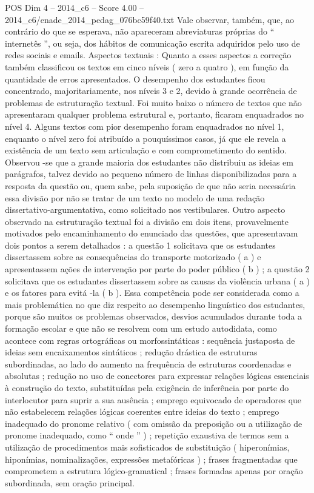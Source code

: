 \begin{textsample}{POS Dim 4 – 2014\_c6 – Score 4.00 – 2014\_c6/enade\_2014\_pedag\_076bc59f40.txt}
Vale observar, também, que, ao contrário do que se esperava, não apareceram abreviaturas próprias do “ internetês ”, ou seja, dos hábitos de comunicação escrita adquiridos pelo uso de redes sociais e emails.
Aspectos textuais : Quanto a esses aspectos a correção também classificou os textos em cinco níveis ( zero a quatro ), em função da quantidade de erros apresentados.
O desempenho dos estudantes ficou concentrado, majoritariamente, nos níveis 3 e 2, devido à grande ocorrência de problemas de estruturação textual.
Foi muito baixo o número de textos que não apresentaram qualquer problema estrutural e, portanto, ficaram enquadrados no nível 4.
Alguns textos com pior desempenho foram enquadrados no nível 1, enquanto o nível zero foi atribuído a pouquíssimos casos, já que ele revela a existência de um texto sem articulação e com comprometimento do sentido.
Observou -se que a grande maioria dos estudantes não distribuiu as ideias em parágrafos, talvez devido ao pequeno número de linhas disponibilizadas para a resposta da questão ou, quem sabe, pela suposição de que não seria necessária essa divisão por não se tratar de um texto no modelo de uma redação dissertativo-argumentativa, como solicitado nos vestibulares.
Outro aspecto observado na estruturação textual foi a divisão em dois itens, provavelmente motivados pelo encaminhamento do enunciado das questões, que apresentavam dois pontos a serem detalhados : a questão 1 solicitava que os estudantes dissertassem sobre as consequências do transporte motorizado ( a ) e apresentassem ações de intervenção por parte do poder público ( b ) ; a questão 2 solicitava que os estudantes dissertassem sobre as causas da violência urbana ( a ) e os fatores para evitá -la ( b ).
Essa competência pode ser considerada como a mais problemática no que diz respeito ao desempenho linguístico dos estudantes, porque são muitos os problemas observados, desvios acumulados durante toda a formação escolar e que não se resolvem com um estudo autodidata, como acontece com regras ortográficas ou morfossintáticas : sequência justaposta de ideias sem encaixamentos sintáticos ; redução drástica de estruturas subordinadas, ao lado do aumento na frequência de estruturas coordenadas e absolutas ; redução no uso de conectores para expressar relações lógicas essenciais à construção do texto, substituídas pela exigência de inferência por parte do interlocutor para suprir a sua ausência ; emprego equivocado de operadores que não estabelecem relações lógicas coerentes entre ideias do texto ; emprego inadequado do pronome relativo ( com omissão da preposição ou a utilização de pronome inadequado, como “ onde ” ) ; repetição exaustiva de termos sem a utilização de procedimentos mais sofisticados de substituição ( hiperonímias, hiponímias, nominalizações, expressões metafóricas ) ; frases fragmentadas que comprometem a estrutura lógico-gramatical ; frases formadas apenas por oração subordinada, sem oração principal.

\end{textsample}
